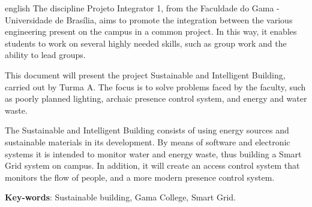 \begin{resumo}[Abstract]
 \begin{otherlanguage*}{english}
   The discipline Projeto Integrator 1, from the Faculdade do Gama - Universidade de
   Brasília, aims to promote the integration between the various engineering
   present on the campus in a common project. In this way, it enables students
   to work on several highly needed skills, such as group work and the ability
   to lead groups.

   This document will present the project Sustainable and
   Intelligent Building, carried out by Turma A. The focus is to solve problems
   faced by the faculty, such as poorly planned lighting,
   archaic presence control system, and energy and water waste.

   The Sustainable and Intelligent Building consists of using energy sources and sustainable
   materials in its development. By means of software and electronic systems it
   is intended to monitor water and energy waste, thus building a Smart Grid
   system on campus. In addition, it will create an access control system that
   monitors the flow of people, and a more modern presence control system.
   \vspace{\onelineskip}

   \noindent
   \textbf{Key-words}: Sustainable building, Gama College, Smart Grid.
 \end{otherlanguage*}
\end{resumo}
